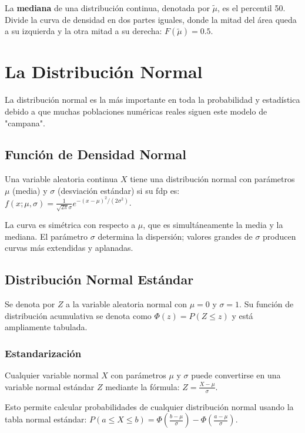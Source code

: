 \documentclass[a4paper]{article}
\begin{document}
La \textbf{mediana} de una distribución continua, denotada por $\tilde{\mu}$, es el percentil 50. Divide la curva de densidad en dos partes iguales, donde la mitad del área queda a su izquierda y la otra mitad a su derecha: $F(\tilde{\mu}) = 0.5$.

\section{La Distribución Normal}

La distribución normal es la más importante en toda la probabilidad y estadística debido a que muchas poblaciones numéricas reales siguen este modelo de "campana".

\subsection{Función de Densidad Normal}

Una variable aleatoria continua $X$ tiene una distribución normal con parámetros $\mu$ (media) y $\sigma$ (desviación estándar) si su fdp es:
$f(x; \mu, \sigma) = \frac{1}{\sqrt{2\pi}\sigma} e^{-(x-\mu)^2/(2\sigma^2)}$.

La curva es simétrica con respecto a $\mu$, que es simultáneamente la media y la mediana. El parámetro $\sigma$ determina la dispersión; valores grandes de $\sigma$ producen curvas más extendidas y aplanadas.

\subsection{Distribución Normal Estándar}

Se denota por $Z$ a la variable aleatoria normal con $\mu = 0$ y $\sigma = 1$. Su función de distribución acumulativa se denota como $\Phi(z) = P(Z \leq z)$ y está ampliamente tabulada.

\subsubsection{Estandarización}

Cualquier variable normal $X$ con parámetros $\mu$ y $\sigma$ puede convertirse en una variable normal estándar $Z$ mediante la fórmula:
$Z = \frac{X - \mu}{\sigma}$.

Esto permite calcular probabilidades de cualquier distribución normal usando la tabla normal estándar: $P(a \leq X \leq b) = \Phi(\frac{b-\mu}{\sigma}) - \Phi(\frac{a-\mu}{\sigma})$.
\end{document}
